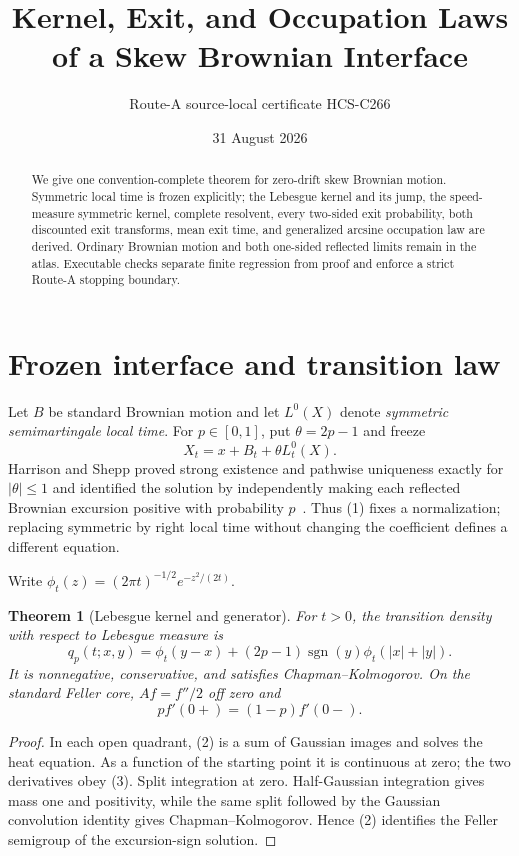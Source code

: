 \documentclass[10pt]{article}
\title{Kernel, Exit, and Occupation Laws\\of a Skew Brownian Interface}
\author{Route-A source-local certificate HCS-C266}
\date{31 August 2026}
\newtheorem{theorem}{Theorem}
\begin{document}
\maketitle
\begin{abstract}
We give one convention-complete theorem for zero-drift skew Brownian motion.
Symmetric local time is frozen explicitly; the Lebesgue kernel and its jump,
the speed-measure symmetric kernel, complete resolvent, every two-sided exit
probability, both discounted exit transforms, mean exit time, and generalized
arcsine occupation law are derived.  Ordinary Brownian motion and both
one-sided reflected limits remain in the atlas.  Executable checks separate
finite regression from proof and enforce a strict Route-A stopping boundary.
\end{abstract}

\section{Frozen interface and transition law}
Let $B$ be standard Brownian motion and let $L^0(X)$ denote \emph{symmetric
semimartingale local time}.  For $p\in[0,1]$, put $\theta=2p-1$ and freeze
\begin{equation}
 X_t=x+B_t+\theta L_t^0(X).
\end{equation}
Harrison and Shepp proved strong existence and pathwise uniqueness exactly
for $|\theta|\le1$ and identified the solution by independently making each
reflected Brownian excursion positive with probability $p$~\cite{HS}.  Thus
(1) fixes a normalization; replacing symmetric by right local time without
changing the coefficient defines a different equation.

Write $\phi_t(z)=(2\pi t)^{-1/2}e^{-z^2/(2t)}$.
\begin{theorem}[Lebesgue kernel and generator]
For $t>0$, the transition density with respect to Lebesgue measure is
\begin{equation}
 q_p(t;x,y)=\phi_t(y-x)+(2p-1)\operatorname{sgn}(y)
 \phi_t(|x|+|y|).
\end{equation}
It is nonnegative, conservative, and satisfies Chapman--Kolmogorov.  On the
standard Feller core, $Af=f''/2$ off zero and
\begin{equation}
 p f'(0+)=(1-p)f'(0-).
\end{equation}
\end{theorem}
\begin{proof}
In each open quadrant, (2) is a sum of Gaussian images and solves the heat
equation.  As a function of the starting point it is continuous at zero; the
two derivatives obey (3).  Split integration at zero.  Half-Gaussian
integration gives mass one and positivity, while the same split followed by
the Gaussian convolution identity gives Chapman--Kolmogorov.  Hence (2)
identifies the Feller semigroup of the excursion-sign solution.
\end{proof}
\end{document}
